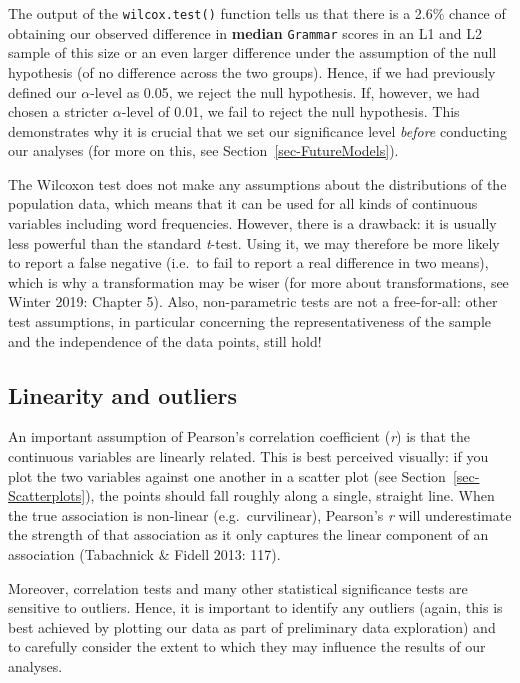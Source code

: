 \documentclass[
  letterpaper,
  DIV=11,
  numbers=noendperiod]{scrreprt}
\begin{document}
The output of the \texttt{wilcox.test()} function tells us that there is
a 2.6\% chance of obtaining our observed difference in \textbf{median}
\texttt{Grammar} scores in an L1 and L2 sample of this size or an even
larger difference under the assumption of the null hypothesis (of no
difference across the two groups). Hence, if we had previously defined
our \(\alpha\)-level as 0.05, we reject the null hypothesis. If,
however, we had chosen a stricter \(\alpha\)-level of 0.01, we fail to
reject the null hypothesis. This demonstrates why it is crucial that we
set our significance level \emph{before} conducting our analyses (for
more on this, see Section~\ref{sec-FutureModels}).

The Wilcoxon test does not make any assumptions about the distributions
of the population data, which means that it can be used for all kinds of
continuous variables including word frequencies. However, there is a
drawback: it is usually less powerful than the standard \emph{t}-test.
Using it, we may therefore be more likely to report a false negative
(i.e.~to fail to report a real difference in two means), which is why a
transformation may be wiser (for more about transformations, see Winter
2019: Chapter 5). Also, non-parametric tests are not a free-for-all:
other test assumptions, in particular concerning the representativeness
of the sample and the independence of the data points, still hold!

\subsection{Linearity and outliers}\label{sec-Linearity}

An important assumption of Pearson's correlation coefficient (\emph{r})
is that the continuous variables are linearly related. This is best
perceived visually: if you plot the two variables against one another in
a scatter plot (see Section~\ref{sec-Scatterplots}), the points should
fall roughly along a single, straight line. When the true association is
non-linear (e.g.~curvilinear), Pearson's \emph{r} will underestimate the
strength of that association as it only captures the linear component of
an association (Tabachnick \& Fidell 2013: 117).

Moreover, correlation tests and many other statistical significance
tests are sensitive to outliers. Hence, it is important to identify any
outliers (again, this is best achieved by plotting our data as part of
preliminary data exploration) and to carefully consider the extent to
which they may influence the results of our analyses.
\end{document}
